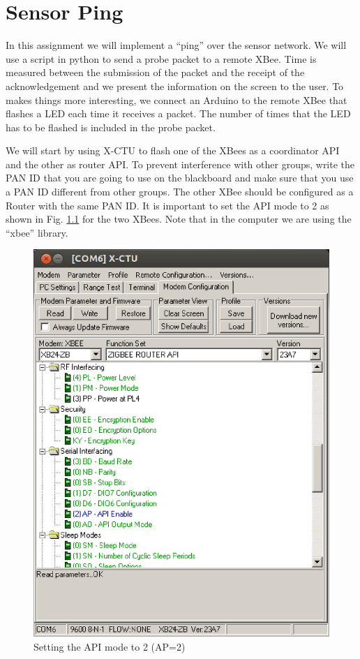 \chapter{Sensor Ping}

In this assignment we will implement a ``ping'' over the sensor network.
We will use a script in python to send a probe packet to a remote XBee.
Time is measured between the submission of the packet and the receipt of the acknowledgement and we present the information on the screen to the user.
To makes things more interesting, we connect an Arduino to the remote XBee that flashes a LED each time it receives a packet.
The number of times that the LED has to be flashed is included in the probe packet.

We will start by using X-CTU to flash one of the XBees as a coordinator API and the other as router API.
To prevent interference with other groups, write the PAN ID that you are going to use on the blackboard and make sure that you use a PAN ID different from other groups.
The other XBee should be configured as a Router with the same PAN ID.
It is important to set the API mode to 2 as shown in Fig. \ref{fig:ap2} for the two XBees.
Note that in the computer we are using the ``xbee'' library.


\begin{figure}[htbp]
  \centering
  \includegraphics[width=0.9\linewidth]{figures/ap2.eps}
  \caption{Setting the API mode to 2 (AP=2)}
  \label{fig:ap2}
\end{figure}

